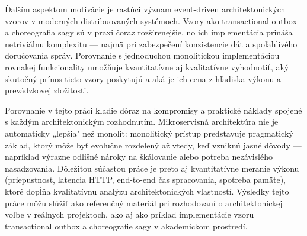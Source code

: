 Ďalším aspektom motivácie je rastúci význam event-driven architektonických vzorov v moderných distribuovaných systémoch. Vzory ako transactional outbox a choreografia sagy sú v praxi čoraz rozšírenejšie, no ich implementácia prináša netriviálnu komplexitu — najmä pri zabezpečení konzistencie dát a spoľahlivého doručovania správ. Porovnanie s jednoduchou monolitickou implementáciou rovnakej funkcionality umožňuje kvantitatívne aj kvalitatívne vyhodnotiť, aký skutočný prínos tieto vzory poskytujú a aká je ich cena z hľadiska výkonu a prevádzkovej zložitosti.

Porovnanie v tejto práci kladie dôraz na kompromisy a praktické náklady spojené s každým architektonickým rozhodnutím. Mikroservisná architektúra nie je automaticky „lepšia" než monolit: monolitický prístup predstavuje pragmatický základ, ktorý môže byť evolučne rozdelený až vtedy, keď vzniknú jasné dôvody — napríklad výrazne odlišné nároky na škálovanie alebo potreba nezávislého nasadzovania. Dôležitou súčasťou práce je preto aj kvantitatívne meranie výkonu (priepustnosť, latencia HTTP, end-to-end čas spracovania, spotreba pamäte), ktoré dopĺňa kvalitatívnu analýzu architektonických vlastností. Výsledky tejto práce môžu slúžiť ako referenčný materiál pri rozhodovaní o architektonickej voľbe v reálnych projektoch, ako aj ako príklad implementácie vzoru transactional outbox a choreografie sagy v akademickom prostredí.
